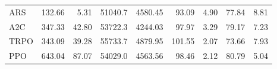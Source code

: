 \begin{samepage}
\begin{center}
\begin{tabular}{l|rr|rr|rr|rr}
    ARS          &   132.66 &     5.31 &    51040.7 &    4580.45 &   93.09 &    4.90 &   77.84 &    8.81 \\
    A2C          &   347.33 &    42.80 &    53722.3 &    4244.03 &   97.97 &    3.29 &   79.17 &    7.23 \\
    TRPO         &   343.09 &    39.28 &    55733.7 &    4879.95 &  101.55 &    2.07 &   73.66 &    7.93 \\
    PPO          &   643.04 &    87.07 &    54029.0 &    4563.56 &   98.46 &    2.12 &   80.79 &    5.04 \\
    \bottomrule
  \end{tabular}
\end{center}
\end{samepage}

